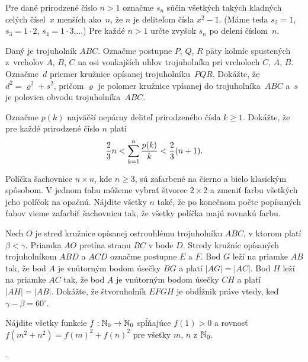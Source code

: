{%
Pre dané prirodzené číslo $n>1$ označme $s_n$ súčin všetkých takých kladných celých čísel~$x$ menších ako~$n$, že $n$ je deliteľom čísla $x^2-1$. (Máme teda $s_2=1$, $s_3=1\cdot2$, $s_4=1\cdot3$,...) Pre každé $n>1$ určte zvyšok $s_n$ po delení číslom~$n$.}

{%
Daný je trojuholník $ABC$. Označme postupne $P$, $Q$, $R$ päty kolmíc spustených z~vrcholov $A$, $B$, $C$ na osi vonkajších uhlov trojuholníka pri vrcholoch $C$, $A$, $B$. Označme~$d$ priemer kružnice opísanej trojuholníku~$PQR$. Dokážte, že $d^2=\varrho^2+s^2$, pričom $\varrho$ je polomer kružnice vpísanej do trojuholníka~$ABC$ a~$s$ je polovica obvodu trojuholníka~$ABC$.}

{%
Označme $p(k)$ najväčší nepárny deliteľ prirodzeného čísla $k \geq 1$. Dokážte, že pre každé prirodzené
číslo $n$ platí
$$
{2\over 3} n < \sum_{k=1}^{n} {{p(k)\over k} } < {2 \over 3} (n+1).
$$}

{%
Políčka šachovnice $ n \times n $, kde $ n \geq 3 $, sú zafarbené na čierno a bielo klasickým spôsobom.
V jednom ťahu môžeme vybrať štvorec $ 2 \times 2 $ a zmeniť farbu všetkých jeho políčok na opačnú.
Nájdite všetky $n$ také, že po konečnom počte popísaných ťahov vieme zafarbiť šachovnicu tak, že
všetky políčka majú rovnakú farbu.}

{%
Nech $O$ je stred kružnice opísanej ostrouhlému trojuholníku $ABC$, v ktorom platí $\beta < \gamma$.
Priamka $AO$ pretína stranu $BC$ v bode $D$. Stredy kružníc opísaných trojuholníkom $ABD$ a $ACD$
označme postupne $E$ a $F$. Bod $G$ leží na priamke $AB$ tak, že bod $A$ je vnútorným bodom úsečky $BG$
a platí $|AG| = |AC|$. Bod $H$ leží na priamke $AC$ tak, že bod $A$ je vnútorným bodom úsečky $CH$
a platí $|AH| = |AB|$. Dokážte, že štvoruholník $EFGH$ je
obdĺžnik práve vtedy, keď $\gamma - \beta = 60 ^\circ $.}

{%
Nájdite všetky funkcie $f : \Bbb N_0 \rightarrow \Bbb N_0$ spĺňajúce $f(1) > 0$ a rovnosť $ f( m^2 + n^2 ) = f(m)^2 + f(n)^2 $
pre všetky $m$, $n$ z $\Bbb N_0$.}

{%
-}
\podpis{-:-}

